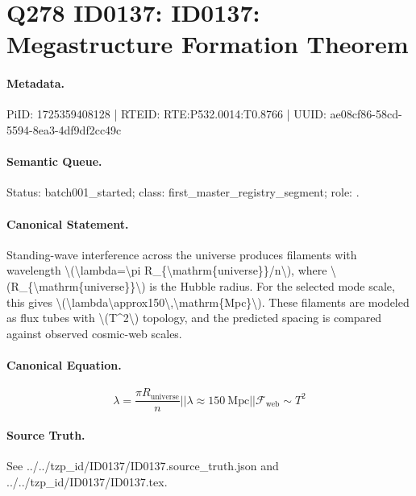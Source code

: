 \section*{Q278 ID0137: ID0137: Megastructure Formation Theorem}
\paragraph{Metadata.}
PiID: 1725359408128 | RTEID: RTE:P532.0014:T0.8766 | UUID: ae08cf86-58cd-5594-8ea3-4df9df2cc49c

\paragraph{Semantic Queue.}
Status: batch001\_started; class: first\_master\_registry\_segment; role: .

\paragraph{Canonical Statement.}
Standing-wave interference across the universe produces filaments with wavelength \textbackslash{}(\textbackslash{}lambda=\textbackslash{}pi R\_\{\textbackslash{}mathrm\{universe\}\}/n\textbackslash{}), where \textbackslash{}(R\_\{\textbackslash{}mathrm\{universe\}\}\textbackslash{}) is the Hubble radius. For the selected mode scale, this gives \textbackslash{}(\textbackslash{}lambda\textbackslash{}approx150\textbackslash{},\textbackslash{}mathrm\{Mpc\}\textbackslash{}). These filaments are modeled as flux tubes with \textbackslash{}(T\textasciicircum{}2\textbackslash{}) topology, and the predicted spacing is compared against observed cosmic-web scales.

\paragraph{Canonical Equation.}
\[
\lambda=\frac{\pi R_{\mathrm{universe}}}{n} || \lambda \approx 150\ \mathrm{Mpc} || \mathcal{F}_{\mathrm{web}}\sim T^2
\]

\paragraph{Source Truth.}
See ../../tzp\_id/ID0137/ID0137.source\_truth.json and ../../tzp\_id/ID0137/ID0137.tex.
